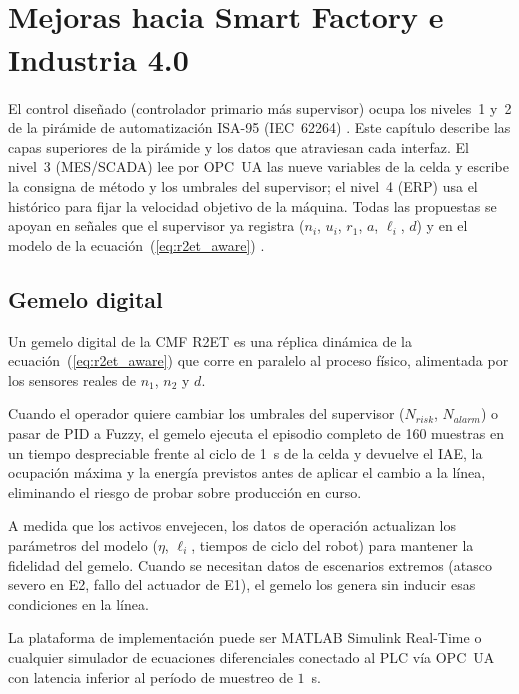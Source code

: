 \chapter[Mejoras hacia Smart Factory e Industria 4.0]{Mejoras hacia Smart Factory e Industria 4.0\textsuperscript{\normalfont *}}
\label{ch:i40}
\begingroup\renewcommand\thefootnote{*}\renewcommand{}\endgroup

El control diseñado (controlador primario más supervisor) ocupa los niveles~1 y~2 de la pirámide de automatización ISA-95 (IEC~62264) \cite{iec62264isa95}. Este capítulo describe las capas superiores de la pirámide y los datos que atraviesan cada interfaz. El nivel~3 (MES/SCADA) lee por OPC~UA las nueve variables de la celda y escribe la consigna de método y los umbrales del supervisor; el nivel~4 (ERP) usa el histórico para fijar la velocidad objetivo de la máquina. Todas las propuestas se apoyan en señales que el supervisor ya registra ($n_i$, $u_i$, $r_1$, $a$, $\ell_i$, $d$) y en el modelo de la ecuación~(\ref{eq:r2et_aware}) \cite{groover2015automation,mccrady2013scada,benitez2022automatizacion}.

\section{Gemelo digital}

Un gemelo digital de la CMF R2ET es una réplica dinámica de la ecuación~(\ref{eq:r2et_aware}) que corre en paralelo al proceso físico, alimentada por los sensores reales de $n_1$, $n_2$ y $d$.

Cuando el operador quiere cambiar los umbrales del supervisor ($N_{risk}$, $N_{alarm}$) o pasar de PID a Fuzzy, el gemelo ejecuta el episodio completo de 160 muestras en un tiempo despreciable frente al ciclo de 1~s de la celda y devuelve el IAE, la ocupación máxima y la energía previstos antes de aplicar el cambio a la línea, eliminando el riesgo de probar sobre producción en curso.

A medida que los activos envejecen, los datos de operación actualizan los parámetros del modelo ($\eta$, $\ell_i$, tiempos de ciclo del robot) para mantener la fidelidad del gemelo. Cuando se necesitan datos de escenarios extremos (atasco severo en E2, fallo del actuador de E1), el gemelo los genera sin inducir esas condiciones en la línea.

La plataforma de implementación puede ser MATLAB Simulink Real-Time o cualquier simulador de ecuaciones diferenciales conectado al PLC vía OPC~UA con latencia inferior al período de muestreo de $1$~s.

